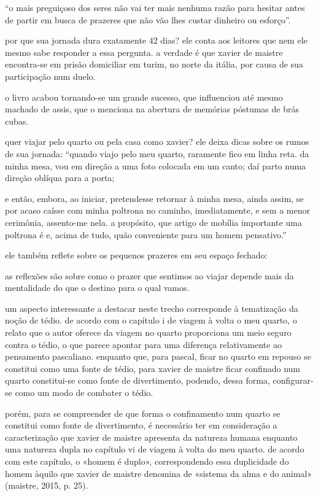“o mais preguiçoso dos seres não vai ter mais nenhuma razão para hesitar antes de partir em busca de prazeres que não vão lhes custar dinheiro ou esforço”.

por que sua jornada dura exatamente 42 dias? ele conta aos leitores que nem ele mesmo sabe responder a essa pergunta. a verdade é que xavier de maistre encontra-se em prisão domiciliar em turim, no norte da itália, por causa de sua participação num duelo. 

o livro acabou tornando-se um grande sucesso, que influenciou até mesmo machado de assis, que o menciona na abertura de memórias póstumas de brás cubas.

quer viajar pelo quarto ou pela casa como xavier? ele deixa dicas sobre os rumos de sua jornada: “quando viajo pelo meu quarto, raramente fico em linha reta. da minha mesa, vou em direção a uma foto colocada em um canto; daí parto numa direção oblíqua para a porta; 

e então, embora, ao iniciar, pretendesse retornar à minha mesa, ainda assim, se por acaso caísse com minha poltrona no caminho, imediatamente, e sem a menor cerimônia, assento-me nela. a propósito, que artigo de mobília importante uma poltrona é e, acima de tudo, quão conveniente para um homem pensativo.”

ele também reflete sobre os pequenos prazeres em seu espaço fechado:

as reflexões são sobre como o prazer que sentimos ao viajar depende mais da mentalidade do que o destino para o qual vamos. 

um aspecto interessante a destacar neste trecho corresponde à tematização da noção de tédio. de acordo com o capítulo i de viagem à volta o meu quarto, o relato que o autor oferece da viagem no quarto proporciona um meio seguro contra o tédio, o que parece apontar para uma diferença relativamente ao pensamento pascaliano. enquanto que, para pascal, ficar no quarto em repouso se constitui como uma fonte de tédio, para xavier de maistre ficar confinado num quarto constitui-se como fonte de divertimento, podendo, dessa forma, configurar-se como um modo de combater o tédio. 

porém, para se compreender de que forma o confinamento num quarto se constitui como fonte de divertimento, é necessário ter em consideração a caracterização que xavier de maistre apresenta da natureza humana enquanto uma natureza dupla no capítulo vi de viagem à volta do meu quarto. de acordo com este capítulo, o «homem é duplo», correspondendo essa duplicidade do homem àquilo que xavier de maistre denomina de «sistema da alma e do animal» (maistre, 2015, p. 25). 

